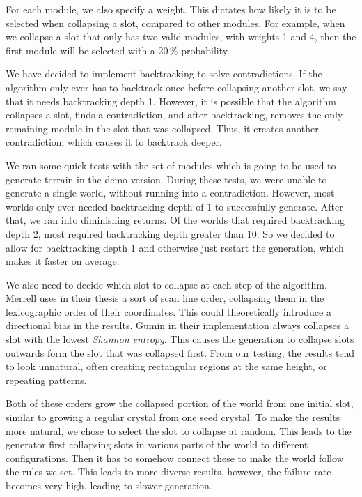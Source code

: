 For each module, we also specify a weight.
This dictates how likely it is to be selected when collapsing a slot, compared to other modules.
For example, when we collapse a slot that only has two valid modules, with weights 1 and 4, then the first module will be selected with a 20\,\% probability.

We have decided to implement backtracking to solve contradictions.
If the algorithm only ever has to backtrack once before collapsing another slot, we say that it needs backtracking depth 1.
However, it is possible that the algorithm collapses a slot, finds a contradiction, and after backtracking, removes the only remaining module in the slot that was collapsed.
Thus, it creates another contradiction, which causes it to backtrack deeper.

We ran some quick tests with the set of modules which is going to be used to generate terrain in the demo version.
During these tests, we were unable to generate a single world, without running into a contradiction.
However, most worlds only ever needed backtracking depth of 1 to successfully generate.
After that, we ran into diminishing returns.
Of the worlds that required backtracking depth 2, most required backtracking depth greater than 10.
So we decided to allow for backtracking depth 1 and otherwise just restart the generation, which makes it faster on average.


We also need to decide which slot to collapse at each step of the algorithm.
Merrell uses in their thesis a sort of scan line order, collapsing them in the lexicographic order of their coordinates.
This could theoretically introduce a directional bias in the results.
Gumin in their implementation always collapses a slot with the lowest \emph{Shannon entropy}.
This causes the generation to collapse slots outwards form the slot that was collapsed first.
From our testing, the results tend to look unnatural, often creating rectangular regions at the same height, or repeating patterns.

Both of these orders grow the collapsed portion of the world from one initial slot, similar to growing a regular crystal from one seed crystal.
To make the results more natural, we chose to select the slot to collapse at random.
This leads to the generator first collapsing slots in various parts of the world to different configurations.
Then it has to somehow connect these to make the world follow the rules we set.
This leads to more diverse results, however, the failure rate becomes very high, leading to slower generation.

